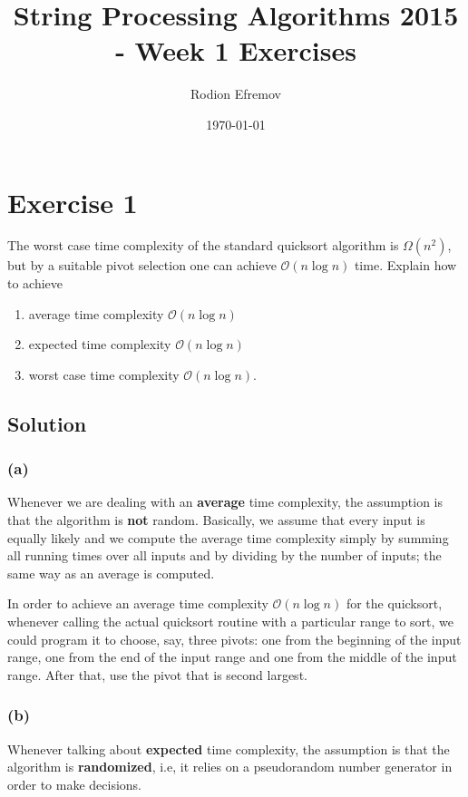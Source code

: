 \documentclass[10pt]{article}
\title{String Processing Algorithms 2015 - Week 1 Exercises}
\author{Rodion Efremov}
\date{\today}
\begin{document}
\maketitle

\section*{Exercise 1}
\color{blue} The worst case time complexity of the standard quicksort algorithm is $\Omega(n^2)$, but by a suitable pivot selection one can achieve $\mathcal{O}(n \log n)$ time. Explain how to achieve
\begin{enumerate}[label=(\alph*)]
\item average time complexity $\mathcal{O}(n \log n)$
\item expected time complexity $\mathcal{O}(n \log n)$
\item worst case time complexity $\mathcal{O}(n \log n)$.
\end{enumerate}
\color{black}

\subsection*{Solution}
\subsubsection*{(a)} Whenever we are dealing with an \textbf{average} time complexity, the assumption is that the algorithm is \textbf{not} random. Basically, we assume that every input is equally likely and we compute the average time complexity simply by summing all running times over all inputs and by dividing by the number of inputs; the same way as an average is computed.

In order to achieve an average time complexity $\mathcal{O}(n \log n)$ for the quicksort, whenever calling the actual quicksort routine with a particular range to sort, we could program it to choose, say, three pivots: one from the beginning of the input range, one from the end of the input range and one from the middle of the input range. After that, use the pivot that is second largest.

\subsubsection*{(b)} Whenever talking about \textbf{expected} time complexity, the assumption is that the algorithm is \textbf{randomized}, i.e, it relies on a pseudorandom number generator in order to make decisions.
\end{document}
